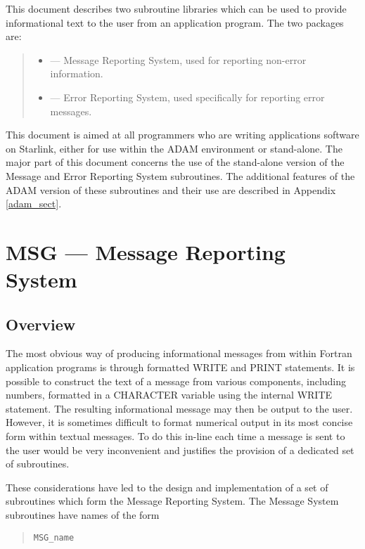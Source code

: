 This document describes two subroutine libraries which can be used to provide
informational text to the user from an application program.
The two packages are:

\begin {quote}
\begin {itemize}
\item [MSG] --- Message Reporting System, used for reporting non-error
information. 

\item [ERR] --- Error Reporting System, used specifically for reporting error
messages.
\end {itemize}
\end {quote}

This document is aimed at all programmers who are writing applications software
on Starlink, either for use within the ADAM environment or stand-alone.
The major part of this document concerns the use of the stand-alone version of
the Message and Error Reporting System subroutines.
The additional features of the ADAM version of these subroutines and their use
are described in Appendix \ref{adam_sect}.

\section {MSG --- Message Reporting System}

\subsection {Overview}

The most obvious way of producing informational messages from within 
Fortran application programs is through formatted WRITE and PRINT 
statements.
It is possible to construct the text of a message from various components, 
including numbers, formatted in a CHARACTER variable using the internal WRITE
statement. 
The resulting informational message may then be output to the user.
However, it is sometimes difficult to format numerical output in its most
concise form within textual messages.
To do this in-line each time a message is sent to the user would be very
inconvenient and justifies the provision of a dedicated set of subroutines. 
 
These considerations have led to the design and implementation of a set of
subroutines which form the Message Reporting System.
The Message System subroutines have names of the form

\begin {quote}
\begin {small}
\begin{verbatim}
MSG_name
\end{verbatim}
\end {small}
\end {quote}

